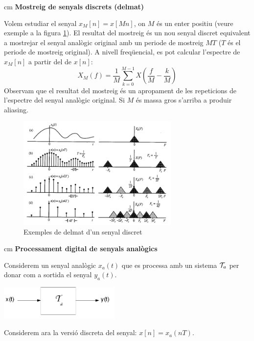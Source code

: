 \documentclass{article}
\begin{document}
 cm
\noindent
\textbf{Mostreig de senyals discrets (delmat)}

Volem estudiar el senyal $x_M[n]=x[Mn]$, on $M$ \'es un enter positiu (veure exemple a la figura \ref{exmostreigdiscret}).
El resultat del mostreig \'es un nou senyal discret equivalent a mostrejar el senyal anal\`ogic
original amb un periode de mostreig $MT$ ($T$ \'es el periode de mostreig original).
A nivell freq\"uencial, es pot calcular l'espectre de $x_M[n]$ a partir del de $x[n]$:
\[
X_M(f)=\frac{1}{M} \sum_{k=0}^{M-1} X(\frac{f}{M}-\frac{k}{M})
\]
Observam que el resultat del mostreig \'es un apropament de les repeticions de l'espectre del senyal
anal\`ogic original. Si $M$ \'es massa gros s'arriba a produir aliasing.

\begin{figure}[htbp]
\begin{center}
\includegraphics[width=8cm]{exmostreigdiscret.png}
\end{center}
\caption{Exemples de delmat d'un senyal discret}
\label{exmostreigdiscret}
\end{figure}


 cm
\noindent
\textbf{\large Processament digital de senyals anal\`ogics}

Considerem un senyal anal\`ogic $x_a(t)$ que es processa amb un sistema ${\cal T}_a$ per donar
com a sortida el senyal $y_a(t)$.

\begin{center}
\begin{minipage}{6cm} \includegraphics[width=6cm]{sistemaanalogic.png}\end{minipage}
\end{center}

Considerem ara la versi\'o discreta del senyal: $x[n]=x_a(nT)$.
\end{document}
